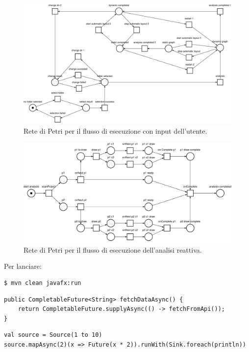 \documentclass[a4paper,12pt]{report}
\begin{document}
    \begin{figure}[h!]
    \centering
    \includegraphics[width=\textwidth]{UI.pdf}
    \caption{Rete di Petri per il flusso di esecuzione con input dell'utente.}
    \label{fig:UI}
    \end{figure}

    \begin{figure}[h!]
    \centering
    \includegraphics[width=\textwidth]{reactive_analysis.pdf}
    \caption{Rete di Petri per il flusso di esecuzione dell'analisi reattiva.}
    \label{fig:reactive_analysis}
    \end{figure}

    Per lanciare:
    \begin{lstlisting}[style=bash, caption={Avvio dello script}]
$ mvn clean javafx:run
    \end{lstlisting}
    \begin{lstlisting}[style=java, caption={Metodo Java asincrono}]
public CompletableFuture<String> fetchDataAsync() {
    return CompletableFuture.supplyAsync(() -> fetchFromApi());
}
    \end{lstlisting}
    \begin{lstlisting}[style=scala, caption={Esempio reattivo in Scala}]
val source = Source(1 to 10)
source.mapAsync(2)(x => Future(x * 2)).runWith(Sink.foreach(println))
    \end{lstlisting}
\end{document}
